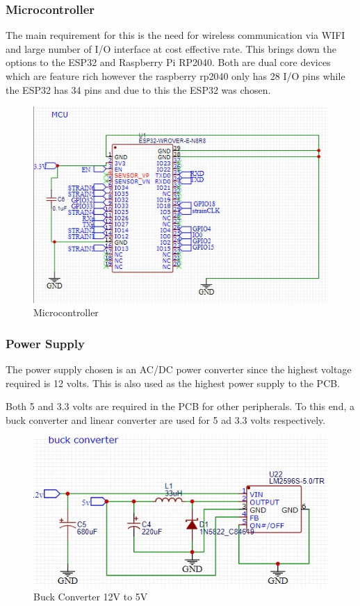 \subsubsection{Microcontroller}
The main requirement for this is the need for wireless communication via WIFI and large number of I/O interface at cost effective rate. This brings down the options to the ESP32 and Raspberry Pi RP2040. Both are dual core devices which are feature rich however the raspberry rp2040 only has 28 I/O pins while the ESP32 has 34 pins and due to this the ESP32 was chosen. 
\begin{center}
	\begin{figure}[H]
	\centering
	\includegraphics[width=0.7\linewidth]{Figures/mcu}
	\caption[Microcontroller]{Microcontroller}
	\end{figure}
\end{center}
\subsubsection{Power Supply}
The power supply chosen is an AC/DC power converter since the highest voltage required is 12 volts. This is also used as the highest power supply to the PCB.

Both 5 and 3.3 volts are required in the PCB for other peripherals. To this end, a buck converter and linear converter are used for 5 ad 3.3 volts respectively.

\begin{center}
	\begin{figure}[H]
	\centering
	\includegraphics{Figures/buck}
	\caption[Buck converter]{Buck Converter 12V to 5V}
	\end{figure}
\end{center}

